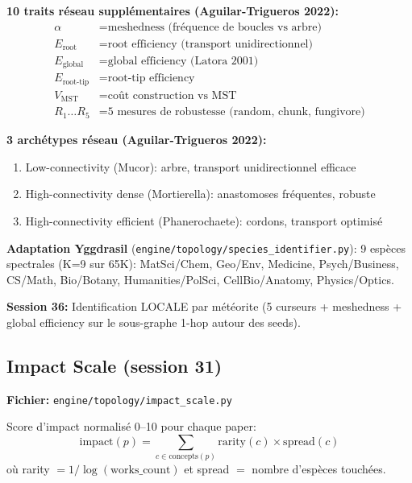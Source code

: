 \documentclass[11pt,a4paper]{article}
\begin{document}
\textbf{10 traits r\'eseau suppl\'ementaires (Aguilar-Trigueros 2022):}
\begin{align}
\alpha &= \text{meshedness (fr\'equence de boucles vs arbre)} \\
E_{\text{root}} &= \text{root efficiency (transport unidirectionnel)} \\
E_{\text{global}} &= \text{global efficiency (Latora 2001)} \\
E_{\text{root-tip}} &= \text{root-tip efficiency} \\
V_{\text{MST}} &= \text{co\^ut construction vs MST} \\
R_1 \ldots R_5 &= \text{5 mesures de robustesse (random, chunk, fungivore)}
\end{align}

\textbf{3 arch\'etypes r\'eseau (Aguilar-Trigueros 2022):}
\begin{enumerate}
\item Low-connectivity (Mucor): arbre, transport unidirectionnel efficace
\item High-connectivity dense (Mortierella): anastomoses fr\'equentes, robuste
\item High-connectivity efficient (Phanerochaete): cordons, transport optimis\'e
\end{enumerate}

\textbf{Adaptation Yggdrasil} (\texttt{engine/topology/species\_identifier.py}):
9 esp\`eces spectrales (K=9 sur 65K):
MatSci/Chem, Geo/Env, Medicine, Psych/Business, CS/Math,
Bio/Botany, Humanities/PolSci, CellBio/Anatomy, Physics/Optics.

\textbf{Session 36:} Identification LOCALE par m\'et\'eorite (5 curseurs + meshedness
+ global efficiency sur le sous-graphe 1-hop autour des seeds).

\subsection{Impact Scale (session 31)}

\textbf{Fichier:} \texttt{engine/topology/impact\_scale.py}

Score d'impact normalis\'e 0--10 pour chaque paper:
\begin{equation}
\text{impact}(p) = \sum_{c \in \text{concepts}(p)} \text{rarity}(c) \times \text{spread}(c)
\end{equation}
o\`u rarity $= 1 / \log(\text{works\_count})$ et spread $=$ nombre d'esp\`eces touch\'ees.
\end{document}
